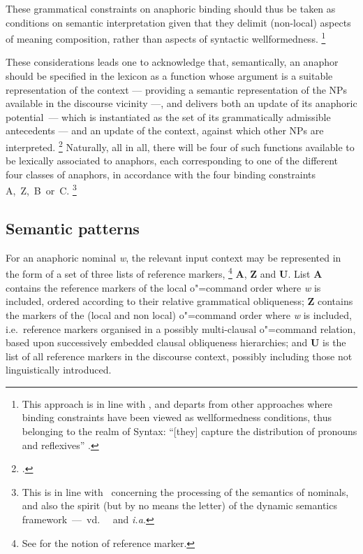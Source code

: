 \documentclass[output=paper
,modfonts
,nonflat]{langsci/langscibook}
\begin{document}
These grammatical constraints on anaphoric binding should thus be taken as conditions on semantic interpretation
given that they delimit (non-local) aspects of meaning composition,
rather than aspects of syntactic wellformedness.%
%
\footnote{
This approach is in line with \citep{gawron:anaph90}, and departs from other approaches where binding constraints have been viewed as 
wellformedness conditions, thus belonging to the
realm of Syntax: ``[they] capture  the distribution of pronouns and reflexives''
\citep[]{rein:refl93}.}



These considerations leads one to acknowledge that, semantically, an anaphor 
should be specified in the lexicon as a function whose argument is
a suitable representation of the context --- providing a
semantic representation of the NPs available in the discourse vicinity ---, 
and delivers both an 
update of its anaphoric potential~--- which is instantiated as 
the set of its grammatically admissible antecedents --- and an update of the 
context, against which other NPs are interpreted.%
\footnote{
\citep{brancoDaarc:1998,brancoColing:2000,branco:2002a}.
}
Naturally, all in all, 
there will be four of
such functions available to be lexically associated to anaphors,
each corresponding to one of the different four classes of anaphors,
in accordance with the four binding constraints A,~Z,~B~or~C.%
%
\footnote{
This is in line with~\citep{johnson:disc90} concerning the 
processing of the semantics of nominals, and also 
the spirit (but by no means the letter) of the dynamic semantics framework~---~vd.~\ \citep{chi:dyn95} and \citep{stal:context98} {\em i.a.}
}

\subsection{Semantic patterns}\label{semanticPatterns}

For an anaphoric nominal {\em w}, the relevant input context may be represented
in the form of a set of  three lists of reference markers,%
\footnote{
See \citep{Karttunen1976, Kamp1981, Heim1982, Seuren1985, kamp:drt93} for the notion of reference marker.
}
{\bf A}, {\bf Z} and
{\bf U}.  List {\bf A} contains the reference markers of the local
\mbox{o"=command} order where {\it w} is included, ordered according to their relative grammatical
obliqueness; {\bf Z} contains  the markers of the (local and non local) \mbox{o"=command} order where {\it w}
is included, i.e.\ reference markers organised in a possibly multi-clausal o"=command relation, 
based upon successively embedded clausal obliqueness hierarchies;
and {\bf U} is the list
of all reference markers in the  discourse context, possibly including those not linguistically
introduced.
\end{document}
